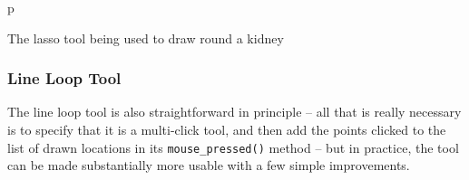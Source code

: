 \begin{stusubfig}{p}
	\hspace{4mm}%
\caption{The lasso tool being used to draw round a kidney}
\label{fig:appendixval-lassotool}
\end{stusubfig}

\subsubsection{Line Loop Tool}

The line loop tool is also straightforward in principle -- all that is really necessary is to specify that it is a multi-click tool, and then add the points clicked to the list of drawn locations in its \texttt{mouse_pressed()} method -- but in practice, the tool can be made substantially more usable with a few simple improvements.

